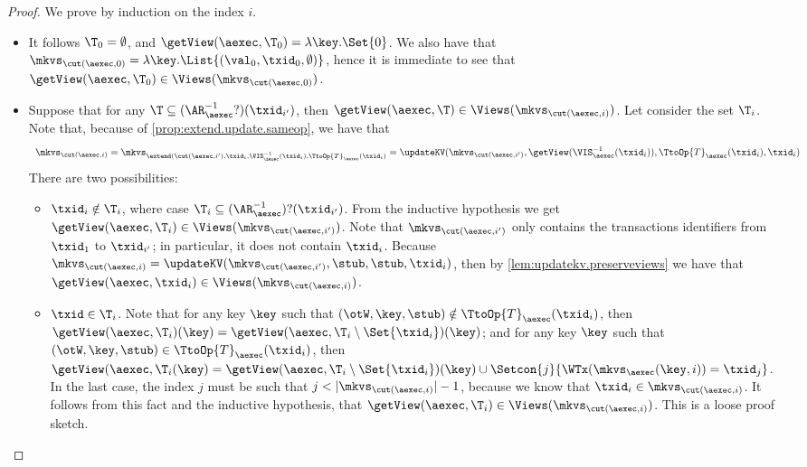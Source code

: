 \begin{proof}
We prove by induction on the index $i$. 
\begin{itemize}
\item {} It follows $\T_{0} = \emptyset$, and $\getView(\aexec, \T_{0}) = \lambda \key. \Set{0}$. 
We also have that $\mkvs_{\cut(\aexec, 0)} = \lambda \key. \List{(\val_0, \txid_{0}, \emptyset)}$, hence 
it is immediate to see that $\getView(\aexec, \T_{0}) \in \Views(\mkvs_{\cut(\aexec, 0)})$.

\item {}
Suppose that for any $\T \subseteq (\AR_{\aexec}^{-1}?)(\txid_{i'})$, 
then $\getView(\aexec, \T) \in \Views(\mkvs_{\cut(\aexec, i)})$. 
Let consider the set $\T_{i}$.
Note that, because of \cref{prop:extend.update.sameop}, we have that
\[
\begin{array}{l}
\mkvs_{\cut(\aexec, i)} =
\mkvs_{\extend(\cut(\aexec, i'), \txid_{i}, \VIS^{-1}_{\aexec}(\txid_{i}), \TtoOp{T}_{\aexec}(\txid_{i})} 
= \updateKV(\mkvs_{\cut(\aexec, i')}, \getView(\VIS^{-1}_{\aexec}(\txid_{i})), \TtoOp{T}_{\aexec}(\txid_{i}), \txid_{i})
\end{array}
\]
There are two possibilities:
\begin{itemize}
\item $\txid_{i} \notin \T_{i}$, where case $\T_{i} \subseteq (\AR_{\aexec}^{-1})?(\txid_{i'})$.
From the inductive hypothesis we get $\getView(\aexec, \T_{i}) \in \Views(\mkvs_{\cut(\aexec, i')})$. 
Note that $\mkvs_{\cut(\aexec, i')}$ only contains the transactions identifiers from $\txid_{1}$ to $\txid_{i'}$;
in particular, it does not contain $\txid_{i}$. 
Because $\mkvs_{\cut(\aexec, i)} = \updateKV(\mkvs_{\cut(\aexec, i')}, \stub, \stub, \txid_{i})$, 
then by \cref{lem:updatekv.preserveviews} we have that $\getView(\aexec, \txid_{i}) \in \Views(\mkvs_{\cut(\aexec, i)})$.

\item $\txid \in \T_{i}$. Note that for any key $\key$ such that 
$(\otW, \key, \stub) \notin \TtoOp{T}_{\aexec}(\txid_{i})$, then 
$\getView(\aexec, \T_{i})(\key) = \getView(\aexec, \T_{i} \setminus \Set{\txid_{i}})(\key)$; 
and for any key $\key$ such that $(\otW, \key, \stub) \in \TtoOp{T}_{\aexec}(\txid_{i})$, 
then $\getView(\aexec, \T_{i}(\key) = \getView(\aexec, \T_{i} \setminus \Set{\txid_{i}})(\key) 
\cup \Setcon{j }{ \WTx(\mkvs_{\aexec}(\key, i)) = \txid_{j}}$. 
In the last case, the index $j$ must be such that $j < \lvert \mkvs_{\cut(\aexec, i)} \rvert - 1$, 
because we know that $\txid_{i} \in \mkvs_{\cut(\aexec, i)}$. 
It follows from this fact and the inductive hypothesis, 
that $\getView(\aexec, \T_{i}) \in \Views(\mkvs_{\cut(\aexec, i)})$.
\ac{This is a loose proof sketch.} 
\end{itemize}
\end{itemize}
\end{proof}

